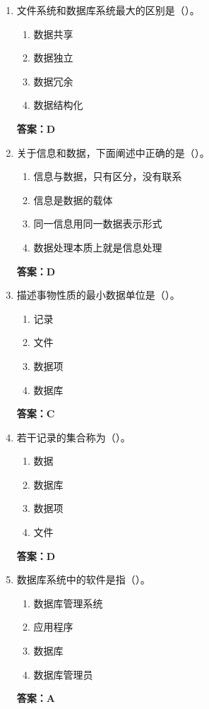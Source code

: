 \documentclass[12pt, a4paper]{article}
\begin{document}
\begin{enumerate}[label=\arabic*.]
	\item 文件系统和数据库系统最大的区别是（\quad）。
	      \begin{enumerate}
		      \item 数据共享
		      \item 数据独立
		      \item 数据冗余
		      \item 数据结构化
	      \end{enumerate}
	      \textbf{答案：D}

	\item 关于信息和数据，下面阐述中正确的是（\quad）。
	      \begin{enumerate}
		      \item 信息与数据，只有区分，没有联系
		      \item 信息是数据的载体
		      \item 同一信息用同一数据表示形式
		      \item 数据处理本质上就是信息处理
	      \end{enumerate}
	      \textbf{答案：D}

	\item 描述事物性质的最小数据单位是（\quad）。
	      \begin{enumerate}
		      \item 记录
		      \item 文件
		      \item 数据项
		      \item 数据库
	      \end{enumerate}
	      \textbf{答案：C}

	\item 若干记录的集合称为（\quad）。
	      \begin{enumerate}
		      \item 数据
		      \item 数据库
		      \item 数据项
		      \item 文件
	      \end{enumerate}
	      \textbf{答案：D}

	\item 数据库系统中的软件是指（\quad）。
	      \begin{enumerate}
		      \item 数据库管理系统
		      \item 应用程序
		      \item 数据库
		      \item 数据库管理员
	      \end{enumerate}
	      \textbf{答案：A}


\end{enumerate}
\end{document}
